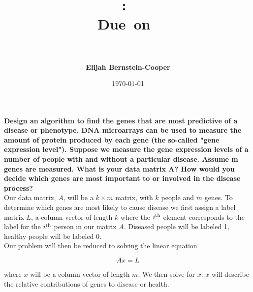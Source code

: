 \documentclass{article}
\title{\vspace{0in}
    \textmd{\textbf{\hmwkClass:\ \hmwkTitle}}\\
    \normalsize\vspace{0.1in}\small{Due\ on\ \hmwkDueDate}\\
    \vspace{0.1in}\large{\textit{\hmwkClassInstructor\ \hmwkClassTime}}
    \vspace{0.5in}}
\author{\textbf{Elijah Bernstein-Cooper}}
\date{\today} %
\begin{document}
\maketitle

\begin{homeworkProblem}

    \textbf{Design an algorithm to find the genes that are most predictive of a
        disease or phenotype. DNA microarrays can be used to measure the amount
        of protein produced by each gene (the so-called "gene expression
        level").  Suppose we measure the gene expression levels of a number of
    people with and without a particular disease.  Assume m genes are
measured.  What is your data matrix A?  How would you decide which genes are
most important to or involved in the disease process?} \\
    
    Our data matrix, $A$, will be a $k \times m$ matrix, with $k$ people and
    $m$ genes. To determine which genes are most likely to cause disease we
    first assign a label matrix $L$, a column vector of length $k$ where the
    $i^{\rm th}$ element corresponds to the label for the $i^{\rm th}$ person
    in our matrix $A$. Diseased people will be labeled 1, healthy people will
    be labeled 0. \\

    Our problem will then be reduced to solving the linear equation

    \begin{equation}
        A x = L
    \end{equation}

    \noindent where $x$ will be a column vector of length $m$. We then solve
    for $x$. $x$ will describe the relative contributions of genes to
    disease or health.

\end{homeworkProblem}
\end{document}
